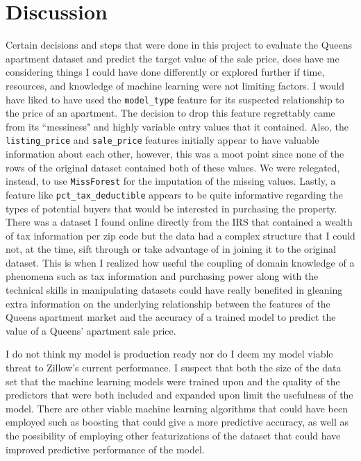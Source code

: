 \documentclass[12pt]{article}
\begin{document}
\section{Discussion}
	\hspace{3mm}	Certain decisions and steps that were done in this project to evaluate the Queens apartment dataset and predict the target value of the sale price, does have me considering things I could have done differently or explored further if time, resources, and knowledge of machine learning were not limiting factors. I would have liked to have used the \texttt{model\_type} feature for its suspected relationship to the price of an apartment. The decision to drop this feature regrettably came from its ``messiness" and highly variable entry values that it  contained. Also, the \texttt{listing\_price} and \texttt{sale\_price} features initially appear to have valuable information about each other, however, this was a moot point since none of the rows of the original dataset contained both of these values. We were relegated, instead, to use \texttt{MissForest} for the imputation of the missing values. Lastly, a feature like \texttt{pct\_tax\_deductible} appears to be quite informative regarding the types of potential buyers that would be interested in purchasing the property. There was a dataset I found online directly from the IRS that contained a wealth of tax information per zip code but the data had a complex structure that I could not, at the time, sift through or take advantage of in joining it to the original dataset. This is when I realized how useful the coupling of domain knowledge of a phenomena such as tax information and purchasing power along with the technical skills in manipulating  datasets could have really benefited in gleaning extra information on the underlying relationship between the features of the Queens apartment market and the accuracy of a trained model to predict the value of a Queens' apartment sale price. 
	
	\hspace{3mm}	 I do not think my model is production ready nor do I deem my model viable threat to Zillow's current performance. I suspect that both the size of the data set that the machine learning models were trained upon and the quality of the predictors that were both included and expanded upon limit the usefulness of the model. There are other viable machine learning algorithms that could have been employed such as boosting that could give a more predictive accuracy, as well as the possibility of employing other featurizations of the dataset that could have improved predictive performance of the model. 
\end{document}
